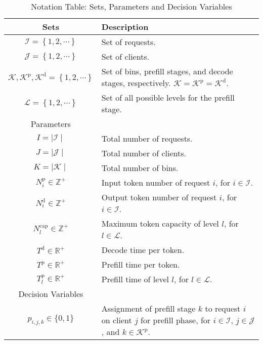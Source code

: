 \begin{table*}
    \centering
    \caption{Notation Table: Sets, Parameters and Decision Variables}
    \begin{tabular}{cl}
    \toprule
        Sets    & Description \\
    \midrule
        $\mathcal{I}=\left\{1,2,\cdots \right\}$  & Set of requests. \\
        $\mathcal{J}=\left\{1,2,\cdots \right\}$  & Set of clients.\\
        $\mathcal{K},\mathcal{K}^\text{p}, \mathcal{K}^\text{d}=\left\{1,2,\cdots \right\}$& Set of bins, prefill stages, and decode stages, respectively. $\mathcal{K} = \mathcal{K}^\text{p} = \mathcal{K}^\text{d}$.\\
        $\mathcal{L}=\left\{1,2,\cdots \right\}$  & Set of all possible levels for the prefill stage.\\
    \midrule
        Parameters          & \\
    \midrule
        $I=\mid \mathcal{I} \mid $                 & Total number of requests.\\
        $J=\mid \mathcal{J} \mid $                 & Total number of clients.\\
        $K=\mid \mathcal{K} \mid $                 & Total number of bins.\\
        $N^\text{p}_i \in \mathbb{Z}^+$             & Input token number of request $i$, for $i\in \mathcal{I}$. \\
        $N^\text{d}_i \in \mathbb{Z}^+$         & Output token number of request $i$, for $i\in \mathcal{I}$. \\
        $N^\text{cap}_l \in \mathbb{Z}^+$        & Maximum token capacity of level $l$, for $l\in \mathcal{L}$. \\  
        $T^\text{d} \in \mathbb{R}^+$            & Decode time per token.\\
        $T^\text{p} \in \mathbb{R}^+$            & Prefill time per token. \\
        $T^\text{p}_l \in \mathbb{R}^+$          & Prefill time of level $l$, for $l\in \mathcal{L}$. \\
    \midrule
        Decision Variables      & \\
    \midrule
        $p_{i,j,k}\in \{0,1\}$ & Assignment of prefill stage $k$ to request $i$ on client $j$ for prefill phase, for $i\in \mathcal{I}$, $j\in \mathcal{J}$, and $k\in \mathcal{K}^\text{p}$.  \\

\end{tabular}
\end{table*}
